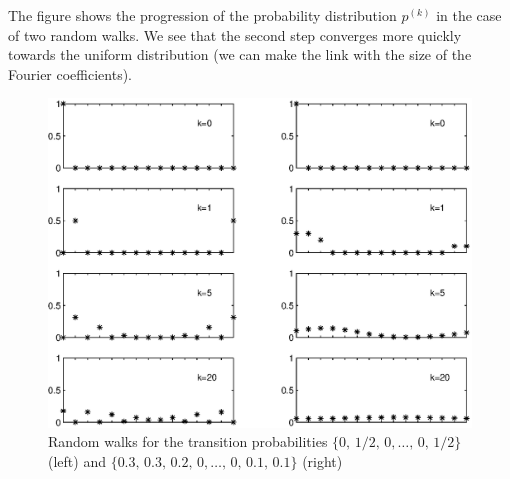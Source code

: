 \begin{exo}
\begin{enumerate}
\end{enumerate} The figure  shows the progression of the probability distribution $ p^{(k)}$ in the case of two random walks. We see that the second step converges more quickly towards the uniform distribution (we can make the link with the size of the Fourier coefficients). \begin{figure}[ht]
    \begin{center}
    \includegraphics[scale = 0.6]{images/marche-aleatoire.eps}
    \end{center}
    \caption{Random walks for the transition probabilities $\{0, \, 1/2, \, 0, \ldots, \, 0, \, 1/2\}$ (left) and $\{0.3, \, 0.3, \, 0.2, \, 0, \ldots, \, 0, \, 0.1, \, 0.1\}$ (right)}
\label{fig-marche-aleatoire}
\end{figure}

\end{exo}


